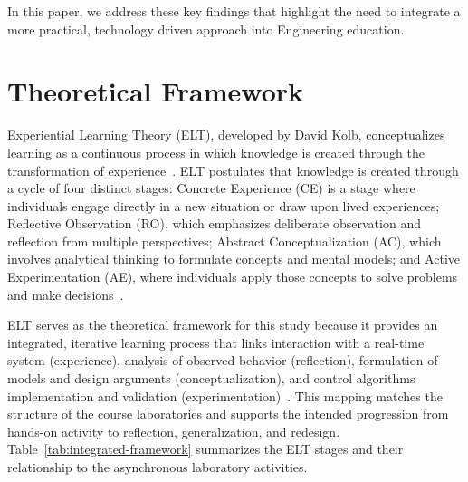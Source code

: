 \documentclass[journal]{IEEEtran}
\begin{document}
In this paper, we address these key findings that highlight the need to integrate a more practical, technology driven approach into Engineering education.


\section{Theoretical Framework}
\label{sec:theoretical-framework}
 
Experiential Learning Theory (ELT), developed by David Kolb, conceptualizes learning as a continuous process in which knowledge is created through the transformation of experience~\cite{kolb1984}. ELT postulates that knowledge is created through a cycle of four distinct stages: %
Concrete Experience (CE) is a stage where individuals engage directly in a new situation or draw upon lived experiences; Reflective Observation (RO), which emphasizes deliberate observation and reflection from multiple perspectives; Abstract Conceptualization (AC), which involves analytical thinking to formulate concepts and mental models; and Active Experimentation (AE), where individuals apply those concepts to solve problems and make decisions~\cite{atkinson1988kolb,ng2009culturalintelligence}.

ELT serves as the theoretical framework for this study because it provides an integrated, iterative learning process that links interaction with a real-time system (experience), analysis of observed behavior (reflection), formulation of models and design arguments (conceptualization), and control algorithms implementation and validation (experimentation)~\cite{kolb1984,atkinson1988kolb,ng2009culturalintelligence}. This mapping matches the structure of the course laboratories and supports the intended progression from hands-on activity to reflection, generalization, and redesign. Table~\ref{tab:integrated-framework} summarizes the ELT stages and their relationship to the asynchronous laboratory activities.


\end{document}
